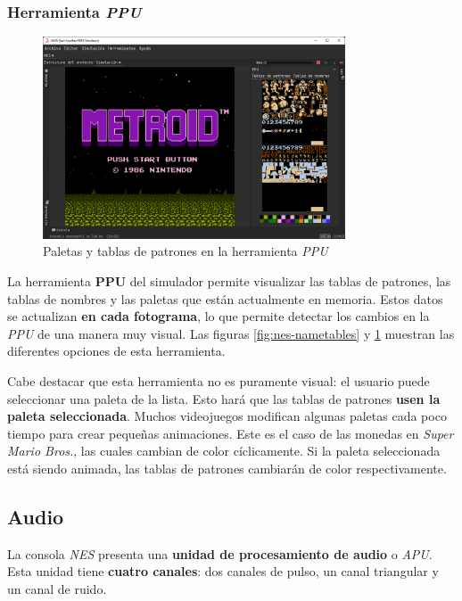 \subsubsection{Herramienta \textit{PPU}}

\begin{figure}[h]
    \centering
    \includegraphics[width=0.8\textwidth]{images/nes/nes-patterntables}
    \caption{Paletas y tablas de patrones en la herramienta \textit{PPU}}
    \label{fig:nes-patterntables}
\end{figure}

La herramienta \textbf{PPU} del simulador permite
visualizar las tablas de patrones, las tablas de nombres
y las paletas que están actualmente en memoria.
Estos datos se actualizan \textbf{en cada fotograma},
lo que permite detectar los cambios en la \textit{PPU}
de una manera muy visual.
Las figuras \ref{fig:nes-nametables} y \ref{fig:nes-patterntables}
muestran las diferentes opciones de esta herramienta.

Cabe destacar que esta herramienta no es puramente visual:
el usuario puede seleccionar una paleta de la lista.
Esto hará que las tablas de patrones \textbf{usen la paleta seleccionada}.
Muchos videojuegos modifican algunas paletas cada poco tiempo
para crear pequeñas animaciones.
Este es el caso de las monedas en \textit{Super Mario Bros.}, las cuales
cambian de color cíclicamente.
Si la paleta seleccionada está siendo animada, las tablas de patrones
cambiarán de color respectivamente.

\subsection{Audio}\label{subsec:audio}

La consola \textit{NES} presenta
una \textbf{unidad de procesamiento de audio} o \textit{APU}.
Esta unidad tiene \textbf{cuatro canales}: dos canales de pulso,
un canal triangular y un canal de ruido.


